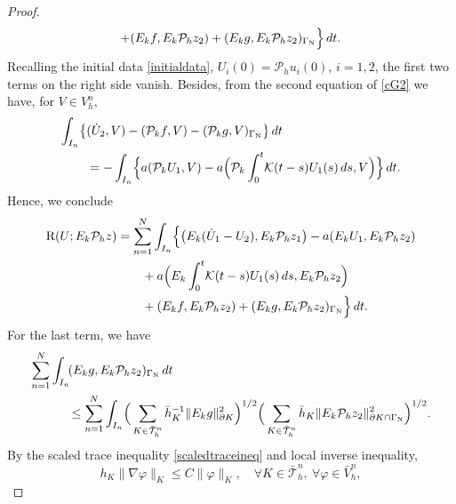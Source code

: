 \documentclass{amsart}
\numberwithin{equation}{section}
\theoremstyle{definition}
\begin{document}
\begin{proof}
\begin{equation*}
\begin{split}
      +(E_kf,E_k{\mathcal P}_hz_2)
      +(E_kg,E_k{\mathcal P}_hz_2)_{\Gamma_{\text N}}\Big\}\,dt.
  \end{split}
\end{equation*}
Recalling the initial data \eqref{initialdata}, 
$U_i(0)={\mathcal P}_hu_i(0),\,i=1,2$, 
the first two terms on the right side vanish. 
Besides, from the second equation of \eqref{cG2} we have,
for $V\in V_h^n$,
\begin{equation*}
  \begin{split}
    \int_{I_n}\!\big\{&(\dot U_2,V)
      -({\mathcal P}_kf,V)-({\mathcal P}_kg,V)_{\Gamma_{\text N}}\big\}\,dt\\
    &=-\int_{I_n}\!\Big\{a({\mathcal P}_kU_1,V)
      -a\Big({\mathcal P}_k\int_0^t\!{\mathcal K}(t-s)U_1(s)\,ds,V\Big)
      \Big\}\,dt.
  \end{split}
\end{equation*}
Hence, we conclude
\begin{equation}   \label{R:UEk}
  \begin{split}
   {\text R}(U;E_k{\mathcal P}_h z)
    &=\sum_{n=1}^N\int_{I_n}\!
      \Big\{\big(E_k(\dot U_1-U_2),E_k{\mathcal P}_hz_1\big)
     -a(E_kU_1,E_k{\mathcal P}_hz_2)\\
      &\qquad +a\Big(E_k\int_0^t\!
      {\mathcal K}(t-s)U_1(s)\,ds,E_k{\mathcal P}_hz_2\Big)\\
    &\qquad
      +(E_kf,E_k{\mathcal P}_hz_2)+(E_kg,E_k{\mathcal P}_hz_2)_{\Gamma_{\text N}}
      \Big\}\,dt.
  \end{split}
\end{equation}
For the last term, 
 we have
\begin{equation*}
  \begin{split}
   \sum_{n=1}^N\int_{I_n}\!
    &(E_kg,E_k{\mathcal P}_hz_2)_{\Gamma_{\text N}}\,dt\\
    &\le \sum_{n=1}^N\int_{I_n}\!
     \Big(\sum_{K\in\bar{\mathcal T}_h^n}
     \bar h_K^{-1}\|E_kg\|_{\partial K}^2\Big)^{1/2}
     \Big(\sum_{K\in\bar{\mathcal T}_h^n}
     \bar h_K\|E_k{\mathcal P}_hz_2\|_{\partial K \cap \Gamma_{\text N}}^2\Big)^{1/2}.
  \end{split}
\end{equation*}
By the scaled trace inequality \eqref{scaledtraceineq} 
and local inverse inequality,  
\begin{equation*}
 h_K\|\nabla \varphi\|_K\leq C\|\varphi\|_K,
  \quad \forall K \in \bar {\mathcal T}_h^n,\ \forall \varphi \in \bar V_h^n,
\end{equation*}

\end{proof}
\end{document}
